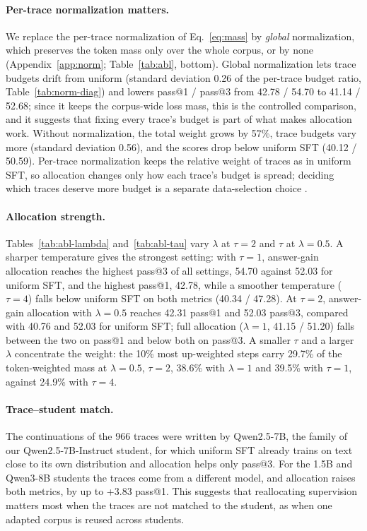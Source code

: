 \documentclass[11pt]{article}
\begin{document}
\paragraph{Per-trace normalization matters.}
\label{sec:normalization_ablation}
We replace the per-trace normalization of Eq.~\ref{eq:mass} by \emph{global} normalization, which preserves the token mass only over the whole corpus, or by none (Appendix~\ref{app:norm}; Table~\ref{tab:abl}, bottom).
Global normalization lets trace budgets drift from uniform (standard deviation 0.26 of the per-trace budget ratio, Table~\ref{tab:norm-diag}) and lowers pass@1 / pass@3 from 42.78 / 54.70 to 41.14 / 52.68; since it keeps the corpus-wide loss mass, this is the controlled comparison, and it suggests that fixing every trace's budget is part of what makes allocation work.
Without normalization, the total weight grows by 57\%, trace budgets vary more (standard deviation 0.56), and the scores drop below uniform SFT (40.12 / 50.59).
Per-trace normalization keeps the relative weight of traces as in uniform SFT, so allocation changes only how each trace's budget is spread; deciding which traces deserve more budget is a separate data-selection choice \citep{muennighoff2025s1,ye2025limo}.

\paragraph{Allocation strength.}
Tables~\ref{tab:abl-lambda} and~\ref{tab:abl-tau} vary $\lambda$ at $\tau=2$ and $\tau$ at $\lambda=0.5$.
A sharper temperature gives the strongest setting: with $\tau=1$, answer-gain allocation reaches the highest pass@3 of all settings, 54.70 against 52.03 for uniform SFT, and the highest pass@1, 42.78, while a smoother temperature ($\tau=4$) falls below uniform SFT on both metrics (40.34 / 47.28).
At $\tau=2$, answer-gain allocation with $\lambda=0.5$ reaches 42.31 pass@1 and 52.03 pass@3, compared with 40.76 and 52.03 for uniform SFT; full allocation ($\lambda=1$, 41.15 / 51.20) falls between the two on pass@1 and below both on pass@3.
A smaller $\tau$ and a larger $\lambda$ concentrate the weight: the 10\% most up-weighted steps carry 29.7\% of the token-weighted mass at $\lambda=0.5$, $\tau=2$, 38.6\% with $\lambda=1$ and 39.5\% with $\tau=1$, against 24.9\% with $\tau=4$.

\paragraph{Trace--student match.}
\label{sec:match}
The continuations of the 966 traces were written by Qwen2.5-7B, the family of our Qwen2.5-7B-Instruct student, for which uniform SFT already trains on text close to its own distribution and allocation helps only pass@3.
For the 1.5B and Qwen3-8B students the traces come from a different model, and allocation raises both metrics, by up to +3.83 pass@1.
This suggests that reallocating supervision matters most when the traces are not matched to the student, as when one adapted corpus is reused across students.
\end{document}
